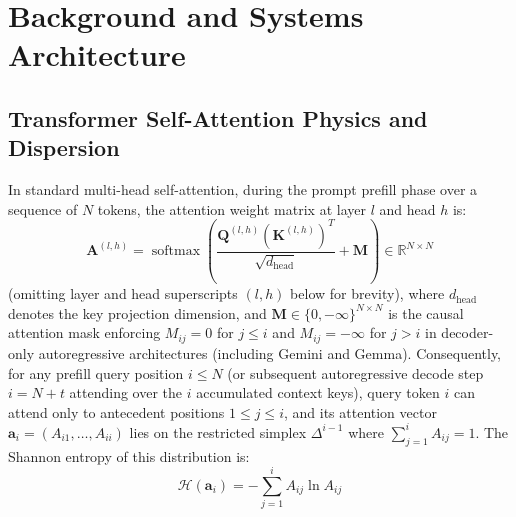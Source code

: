 \documentclass[conference,10pt]{IEEEtran}
\begin{document}
\section{Background and Systems Architecture}
\label{sec:background}

\subsection{Transformer Self-Attention Physics and Dispersion}
In standard multi-head self-attention, during the prompt prefill phase over a sequence of $N$ tokens, the attention weight matrix at layer $l$ and head $h$ is:
\begin{equation}
\label{eq:attention_matrix}
\mathbf{A}^{(l,h)} = \operatorname{softmax}\left(\frac{\mathbf{Q}^{(l,h)}(\mathbf{K}^{(l,h)})^T}{\sqrt{d_{\text{head}}}} + \mathbf{M}\right) \in \mathbb{R}^{N \times N}
\end{equation}
(omitting layer and head superscripts $(l,h)$ below for brevity), where $d_{\text{head}}$ denotes the key projection dimension, and $\mathbf{M} \in \{0, -\infty\}^{N \times N}$ is the causal attention mask enforcing $M_{ij} = 0$ for $j \le i$ and $M_{ij} = -\infty$ for $j > i$ in decoder-only autoregressive architectures (including Gemini and Gemma). Consequently, for any prefill query position $i \le N$ (or subsequent autoregressive decode step $i = N + t$ attending over the $i$ accumulated context keys), query token $i$ can attend only to antecedent positions $1 \le j \le i$, and its attention vector $\mathbf{a}_i = (A_{i1}, \dots, A_{ii})$ lies on the restricted simplex $\Delta^{i-1}$ where $\sum_{j=1}^i A_{ij} = 1$. The Shannon entropy of this distribution is:
\begin{equation}
\label{eq:entropy_def}
\mathcal{H}(\mathbf{a}_i) = - \sum_{j=1}^i A_{ij} \ln A_{ij}
\end{equation}
\end{document}
